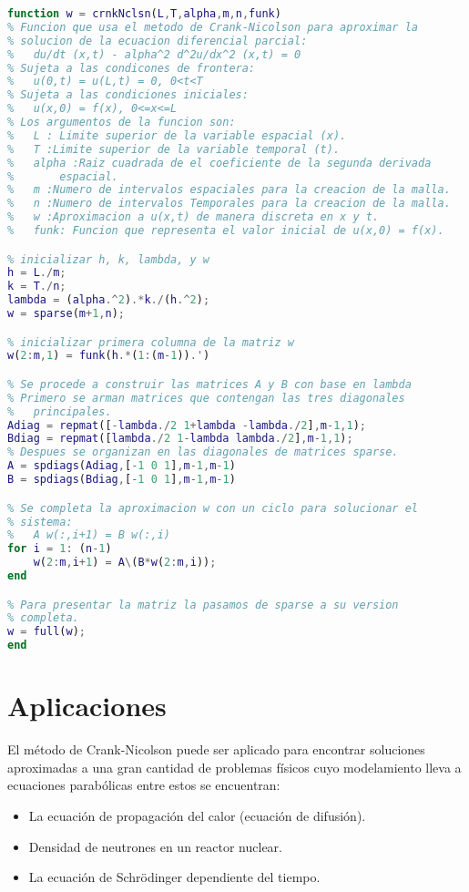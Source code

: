 \documentclass[11pt]{article} %
\begin{document}
\begin{lstlisting}[language=Matlab]
function w = crnkNclsn(L,T,alpha,m,n,funk)
% Funcion que usa el metodo de Crank-Nicolson para aproximar la 
% solucion de la ecuacion diferencial parcial:
%	du/dt (x,t) - alpha^2 d^2u/dx^2 (x,t) = 0
% Sujeta a las condicones de frontera:
%	u(0,t) = u(L,t) = 0, 0<t<T
% Sujeta a las condiciones iniciales:
%	u(x,0) = f(x), 0<=x<=L
% Los argumentos de la funcion son:
%	L : Limite superior de la variable espacial (x).
%	T :Limite superior de la variable temporal (t).
%	alpha :Raiz cuadrada de el coeficiente de la segunda derivada 
% 		espacial.
%	m :Numero de intervalos espaciales para la creacion de la malla.
%	n :Numero de intervalos Temporales para la creacion de la malla.
%	w :Aproximacion a u(x,t) de manera discreta en x y t.
%	funk: Funcion que representa el valor inicial de u(x,0) = f(x).

% inicializar h, k, lambda, y w
h = L./m;
k = T./n;
lambda = (alpha.^2).*k./(h.^2);
w = sparse(m+1,n);

% inicializar primera columna de la matriz w
w(2:m,1) = funk(h.*(1:(m-1)).')

% Se procede a construir las matrices A y B con base en lambda
% Primero se arman matrices que contengan las tres diagonales 
%	principales.
Adiag = repmat([-lambda./2 1+lambda -lambda./2],m-1,1);
Bdiag = repmat([lambda./2 1-lambda lambda./2],m-1,1);
% Despues se organizan en las diagonales de matrices sparse.
A = spdiags(Adiag,[-1 0 1],m-1,m-1)
B = spdiags(Bdiag,[-1 0 1],m-1,m-1)

% Se completa la aproximacion w con un ciclo para solucionar el
% sistema:
%	A w(:,i+1) = B w(:,i)
for i = 1: (n-1)
	w(2:m,i+1) = A\(B*w(2:m,i));
end

% Para presentar la matriz la pasamos de sparse a su version
% completa.
w = full(w);
end
\end{lstlisting}

\section*{Aplicaciones}
El método de Crank-Nicolson puede ser aplicado para encontrar soluciones aproximadas a una gran cantidad de problemas físicos cuyo modelamiento lleva a ecuaciones parabólicas entre estos se encuentran:  
\begin{itemize}
    \item La ecuación de propagación del calor (ecuación de difusión).
    \item Densidad de neutrones en un reactor nuclear.
    \item La ecuación de Schrödinger dependiente del tiempo.
\end{itemize}






\end{document}
